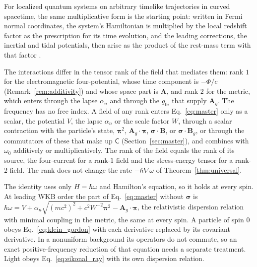 \documentclass[aps,prd,onecolumn,tightenlines,nofootinbib,notitlepage,11pt,floatfix]{revtex4-2}
\theoremstyle{indentedtheorem}
\begin{document}
For localized quantum systems on arbitrary timelike trajectories in curved spacetime, the same multiplicative form is the starting point: written in Fermi normal coordinates, the system's Hamiltonian is multiplied by the local redshift factor as the prescription for its time evolution, and the leading corrections, the inertial and tidal potentials, then arise as the product of the rest-mass term with that factor \citep{Perche2022Localized}.

The interactions differ in the tensor rank of the field that mediates them: rank $1$ for the electromagnetic four-potential, whose time component is $-\Phi/c$ (Remark~\ref{rem:additivity}) and whose space part is $\mathbf{A}$, and rank $2$ for the metric, which enters through the lapse $\alpha_n$ and through the $g_{0i}$ that supply $\mathbf{A}_g$. The frequency has no free index. A field of any rank enters Eq.~\eqref{eq:master} only as a scalar, the potential $V$, the lapse $\alpha_n$ or the scale factor $W$, through a scalar contraction with the particle's state, $\boldsymbol{\pi}^2$, $\mathbf{A}_g\cdot\boldsymbol{\pi}$, $\boldsymbol{\sigma}\cdot\mathbf{B}$, or $\boldsymbol{\sigma}\cdot\mathbf{B}_g$, or through the commutators of these that make up $\mathsf{C}$ (Section~\ref{sec:master}), and combines with $\omega_0$ additively or multiplicatively. The rank of the field equals the rank of its source, the four-current for a rank-$1$ field and the stress-energy tensor for a rank-$2$ field. The rank does not change the rate $-\hbar\nabla\omega$ of Theorem~\ref{thm:universal}.

The identity uses only $H=\hbar\omega$ and Hamilton's equation, so it holds at every spin. At leading WKB order the part of Eq.~\eqref{eq:master} without $\boldsymbol{\sigma}$ is $\hbar\omega=V+\alpha_n\sqrt{(mc^2)^2+c^2W^{-2}\boldsymbol{\pi}^2}-\mathbf{A}_g\cdot\boldsymbol{\pi}$, the relativistic dispersion relation with minimal coupling in the metric, the same at every spin. A particle of spin $0$ obeys Eq.~\eqref{eq:klein_gordon} with each derivative replaced by its covariant derivative. In a nonuniform background its operators do not commute, so an exact positive-frequency reduction of that equation needs a separate treatment. Light obeys Eq.~\eqref{eq:eikonal_ray} with its own dispersion relation.
\end{document}

